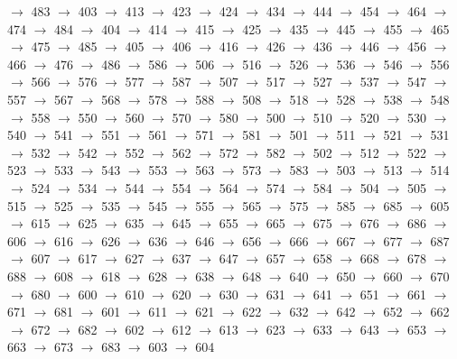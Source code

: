 $\rightarrow$ 483 $\rightarrow$ 403 $\rightarrow$ 413 $\rightarrow$ 423 $\rightarrow$ 424 $\rightarrow$ 434 $\rightarrow$ 444 $\rightarrow$ 454 $\rightarrow$ 464 $\rightarrow$ 474 $\rightarrow$ 484 $\rightarrow$ 404 $\rightarrow$ 414 $\rightarrow$ 415 $\rightarrow$ 425 $\rightarrow$ 435 $\rightarrow$ 445 $\rightarrow$ 455 $\rightarrow$ 465 $\rightarrow$ 475 $\rightarrow$ 485 $\rightarrow$ 405 $\rightarrow$ 406 $\rightarrow$ 416 $\rightarrow$ 426 $\rightarrow$ 436 $\rightarrow$ 446 $\rightarrow$ 456 $\rightarrow$ 466 $\rightarrow$ 476 $\rightarrow$ 486 $\rightarrow$ 586 $\rightarrow$ 506 $\rightarrow$ 516 $\rightarrow$ 526 $\rightarrow$ 536 $\rightarrow$ 546 $\rightarrow$ 556 $\rightarrow$ 566 $\rightarrow$ 576 $\rightarrow$ 577 $\rightarrow$ 587 $\rightarrow$ 507 $\rightarrow$ 517 $\rightarrow$ 527 $\rightarrow$ 537 $\rightarrow$ 547 $\rightarrow$ 557 $\rightarrow$ 567 $\rightarrow$ 568 $\rightarrow$ 578 $\rightarrow$ 588 $\rightarrow$ 508 $\rightarrow$ 518 $\rightarrow$ 528 $\rightarrow$ 538 $\rightarrow$ 548 $\rightarrow$ 558 $\rightarrow$ 550 $\rightarrow$ 560 $\rightarrow$ 570 $\rightarrow$ 580 $\rightarrow$ 500 $\rightarrow$ 510 $\rightarrow$ 520 $\rightarrow$ 530 $\rightarrow$ 540 $\rightarrow$ 541 $\rightarrow$ 551 $\rightarrow$ 561 $\rightarrow$ 571 $\rightarrow$ 581 $\rightarrow$ 501 $\rightarrow$ 511 $\rightarrow$ 521 $\rightarrow$ 531 $\rightarrow$ 532 $\rightarrow$ 542 $\rightarrow$ 552 $\rightarrow$ 562 $\rightarrow$ 572 $\rightarrow$ 582 $\rightarrow$ 502 $\rightarrow$ 512 $\rightarrow$ 522 $\rightarrow$ 523 $\rightarrow$ 533 $\rightarrow$ 543 $\rightarrow$ 553 $\rightarrow$ 563 $\rightarrow$ 573 $\rightarrow$ 583 $\rightarrow$ 503 $\rightarrow$ 513 $\rightarrow$ 514 $\rightarrow$ 524 $\rightarrow$ 534 $\rightarrow$ 544 $\rightarrow$ 554 $\rightarrow$ 564 $\rightarrow$ 574 $\rightarrow$ 584 $\rightarrow$ 504 $\rightarrow$ 505 $\rightarrow$ 515 $\rightarrow$ 525 $\rightarrow$ 535 $\rightarrow$ 545 $\rightarrow$ 555 $\rightarrow$ 565 $\rightarrow$ 575 $\rightarrow$ 585 $\rightarrow$ 685 $\rightarrow$ 605 $\rightarrow$ 615 $\rightarrow$ 625 $\rightarrow$ 635 $\rightarrow$ 645 $\rightarrow$ 655 $\rightarrow$ 665 $\rightarrow$ 675 $\rightarrow$ 676 $\rightarrow$ 686 $\rightarrow$ 606 $\rightarrow$ 616 $\rightarrow$ 626 $\rightarrow$ 636 $\rightarrow$ 646 $\rightarrow$ 656 $\rightarrow$ 666 $\rightarrow$ 667 $\rightarrow$ 677 $\rightarrow$ 687 $\rightarrow$ 607 $\rightarrow$ 617 $\rightarrow$ 627 $\rightarrow$ 637 $\rightarrow$ 647 $\rightarrow$ 657 $\rightarrow$ 658 $\rightarrow$ 668 $\rightarrow$ 678 $\rightarrow$ 688 $\rightarrow$ 608 $\rightarrow$ 618 $\rightarrow$ 628 $\rightarrow$ 638 $\rightarrow$ 648 $\rightarrow$ 640 $\rightarrow$ 650 $\rightarrow$ 660 $\rightarrow$ 670 $\rightarrow$ 680 $\rightarrow$ 600 $\rightarrow$ 610 $\rightarrow$ 620 $\rightarrow$ 630 $\rightarrow$ 631 $\rightarrow$ 641 $\rightarrow$ 651 $\rightarrow$ 661 $\rightarrow$ 671 $\rightarrow$ 681 $\rightarrow$ 601 $\rightarrow$ 611 $\rightarrow$ 621 $\rightarrow$ 622 $\rightarrow$ 632 $\rightarrow$ 642 $\rightarrow$ 652 $\rightarrow$ 662 $\rightarrow$ 672 $\rightarrow$ 682 $\rightarrow$ 602 $\rightarrow$ 612 $\rightarrow$ 613 $\rightarrow$ 623 $\rightarrow$ 633 $\rightarrow$ 643 $\rightarrow$ 653 $\rightarrow$ 663 $\rightarrow$ 673 $\rightarrow$ 683 $\rightarrow$ 603 $\rightarrow$ 604 